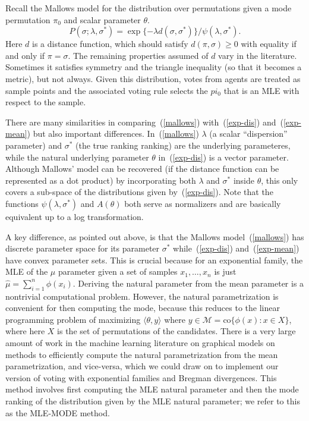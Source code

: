 \documentclass[10pt,letterpaper]{article}
\newcommand{\mM}{\ensuremath{\mathcal{M}}}
\newcommand{\ip}[2]{\ensuremath{\langle #1, #2 \rangle}}
\newcommand{\co}{\mbox{co}}
\begin{document}
Recall the Mallows model for the distribution over permutations given a mode permutation $\pi_0$ and scalar parameter $\theta$.
%
\begin{equation} \label{mallows}
P(\sigma ; \lambda, \sigma^*) = \exp\{ -\lambda d(\sigma,\sigma^*) \} / \psi(\lambda, \sigma^*).
\end{equation}
%
Here $d$ is a distance function, which should satisfy $d(\pi, \sigma) \geq 0$ with equality if and only if $\pi = \sigma$. The remaining properties assumed of $d$ vary in the literature. Sometimes it satisfies symmetry and the triangle inequality (so that it becomes a metric), but not always. Given this distribution, votes from agents are treated as sample points and the associated voting rule selects the $pi_0$ that is an MLE with respect to the sample.

There are many similarities in comparing~(\ref{mallows}) with~(\ref{exp-dis}) and~(\ref{exp-mean}) but also important differences. In~(\ref{mallows}) $\lambda$ (a scalar ``dispersion'' parameter) and $\sigma^*$ (the true ranking ranking) are the underlying parameteres, while the natural underlying parameter $\theta$ in~(\ref{exp-dis}) is a vector parameter. Although Mallows' model can be recovered (if the distance function can be represented as a dot product) by incorporating both $\lambda$ and $\sigma^*$ inside $\theta$, this only covers a sub-space of the distributions given by~(\ref{exp-dis}). Note that the functions $\psi(\lambda, \sigma^*)$ and $A(\theta)$ both serve as normalizers and are basically equivalent up to a log transformation.

A key difference, as pointed out above, is that the Mallows model~(\ref{mallows}) has discrete parameter space for its parameter $\sigma^*$ while~(\ref{exp-dis}) and~(\ref{exp-mean}) have convex parameter sets. This is crucial because for an exponential family, the MLE of the $\mu$ parameter given a set of samples $x_1,\ldots,x_n$ is just $\hat{\mu} = \sum_{i=1}^n \phi(x_i)$. Deriving the natural parameter from the mean parameter is a nontrivial computational problem. However, the natural parametrization is convenient for then computing the mode, because this reduces to the linear programming problem of maximizing $\ip{\theta}{y}$ where $y \in \mM = \co\{ \phi(x) : x \in X \}$, where here $X$ is the set of permutations of the candidates. There is a very large amount of work in the machine learning literature on graphical models on methods to efficiently compute the natural parametrization from the mean parametrization, and vice-versa, which we could draw on to implement our version of voting with exponential families and Bregman divergences. This method involves first computing the MLE natural parameter and then the mode ranking of the distribution given by the MLE natural parameter; we refer to this as the MLE-MODE method.
\end{document}
